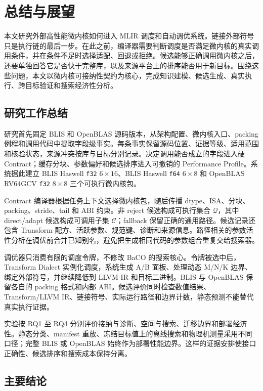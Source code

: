 
\chapter{总结与展望}
\label{chap:conclusion}

本文研究外部高性能微内核如何进入 MLIR 调度和自动调优系统。链接外部符号只是执行链的最后一步。在此之前，编译器需要判断调度是否满足微内核的真实调用条件，并在条件不足时选择适配、回退或拒绝。候选能够正确调用微内核之后，还要单独回答它是否快于完整库，以及来源平台上的排序能否用于新目标。围绕这些问题，本文以微内核可接纳性契约为核心，完成知识建模、候选生成、真实执行、跨目标验证和搜索经济性分析。

\section{研究工作总结}

研究首先固定 BLIS 和 OpenBLAS 源码版本，从架构配置、微内核入口、packing 例程和调用代码中提取字段级事实。每条事实保留源码位置、证据等级、适用范围和核验状态，来源冲突按库与目标分别记录。决定调用能否成立的字段进入硬 Contract；缓存分块、参数偏好和候选排序进入可撤销的 Performance Profile。系统据此建立 BLIS Haswell \texttt{f32} $6\times16$、BLIS Haswell \texttt{f64} $6\times8$ 和 OpenBLAS RV64GCV \texttt{f32} $8\times8$ 三个可执行微内核包。

Contract 编译器根据任务上下文选择微内核包，随后传播 dtype、ISA、分块、packing、stride、tail 和 ABI 约束。非 reject 候选构成可执行集合 $\mathcal{Q}$，其中 direct/adapt 候选构成可调用子集 $\mathcal{C}$；fallback 保留正确的通用路径。候选记录还包含 Transform 配方、活跃参数、规范键、诊断和来源信息。路径相关的参数活性分析在调优前合并已知别名，避免把生成相同代码的参数组合重复交给搜索器。

调优器只消费有限的调度令牌，不修改 BaCO 的搜索核心。令牌被选中后，Transform Dialect 实例化调度，系统生成 A/B 面板、处理动态 M/N/K 边界、绑定外部符号，并继续降低到 LLVM IR 和目标二进制。BLIS 与 OpenBLAS 保留各自的 packing 格式和内部 ABI。候选评价同时检查数值结果、Transform/LLVM IR、链接符号、实际运行路径和边界计数，静态预测不能替代真实执行证据。

实验按 RQ1 至 RQ4 分别评价接纳与诊断、空间与搜索、迁移边界和部署经济性。静态分类、manifest 重放、冻结目标值上的离线搜索和物理机测量采用不同口径；完整 BLIS 或 OpenBLAS 始终作为部署性能边界。这样的证据安排使接口正确性、候选排序和搜索成本保持分离。

\section{主要结论}

